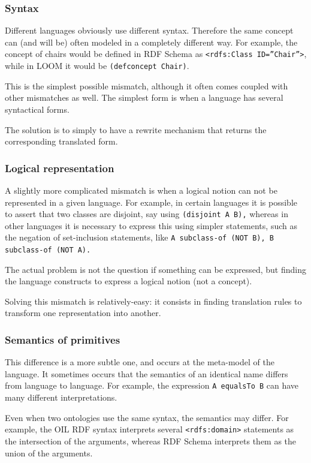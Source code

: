 \subsubsection{Syntax}
Different languages obviously use different syntax. Therefore the same
concept can (and will be) often modeled in a completely different way.
For example, the concept of chairs would be defined in RDF Schema as
\texttt{{\textless}rdfs:Class
ID={\textquotedblright}Chair{\textquotedblright}{\textgreater}}, while
in LOOM it would be \texttt{(defconcept Chair)}. 

This is the simplest possible mismatch, although it often comes coupled
with other mismatches as well. The simplest form is when a language has
several syntactical forms. 

The solution is to simply to have a rewrite mechanism that returns the
corresponding translated form. 

\subsubsection{Logical representation}
A slightly more complicated mismatch is when a logical notion can not be
represented in a given language. For example, in certain languages it
is possible to assert that two classes are disjoint, say using
\texttt{(disjoint A B),} whereas in other languages it is
necessary to express this using simpler statements, such as the
negation of set-inclusion statements, like \texttt{A
subclass-of (NOT B), B subclass-of (NOT A).} 

The actual problem is not the question if something can be expressed,
but finding the language constructs to express a logical notion (not a
concept). 

Solving this mismatch is relatively-easy: it consists in finding
translation rules to transform one representation into another. 

\subsubsection{Semantics of primitives}
This difference is a more subtle one, and occurs at the meta-model of
the language. It sometimes occurs that the semantics of an identical
name differs from language to language. For example, the expression
\texttt{A equalsTo B} can have many different
interpretations. 

Even when two ontologies use the same syntax, the semantics may differ.
For example, the OIL RDF syntax interprets several
\texttt{{\textless}rdfs:domain{\textgreater}} statements
as the intersection of the arguments, whereas RDF Schema interprets
them as the union of the arguments. 

